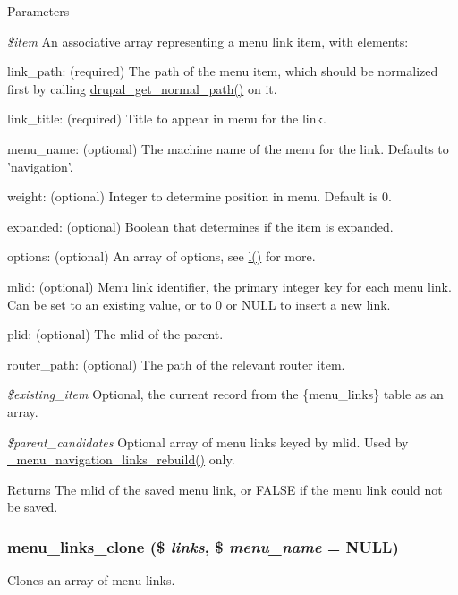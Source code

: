 \begin{DoxyParams}{Parameters}
\item[{\em \$item}]An associative array representing a menu link item, with elements:
\begin{DoxyItemize}
\item link\_\-path: (required) The path of the menu item, which should be normalized first by calling \hyperlink{path_8inc_a59781811cbcdef4c64ccd1d55e1ae9f8}{drupal\_\-get\_\-normal\_\-path()} on it.
\item link\_\-title: (required) Title to appear in menu for the link.
\item menu\_\-name: (optional) The machine name of the menu for the link. Defaults to 'navigation'.
\item weight: (optional) Integer to determine position in menu. Default is 0.
\item expanded: (optional) Boolean that determines if the item is expanded.
\item options: (optional) An array of options, see \hyperlink{common_8inc_ad3b36c06dc46250b8d22b8d0d2e7bd97}{l()} for more.
\item mlid: (optional) Menu link identifier, the primary integer key for each menu link. Can be set to an existing value, or to 0 or NULL to insert a new link.
\item plid: (optional) The mlid of the parent.
\item router\_\-path: (optional) The path of the relevant router item. 
\end{DoxyItemize}\item[{\em \$existing\_\-item}]Optional, the current record from the \{menu\_\-links\} table as an array. \item[{\em \$parent\_\-candidates}]Optional array of menu links keyed by mlid. Used by \hyperlink{group__menu_ga69fdf86c20d033bc7ba46a14937e20ea}{\_\-menu\_\-navigation\_\-links\_\-rebuild()} only.\end{DoxyParams}
\begin{DoxyReturn}{Returns}
The mlid of the saved menu link, or FALSE if the menu link could not be saved. 
\end{DoxyReturn}
\hypertarget{group__menu_ga327aef442c1c6c4b2a7d14742f37af2a}{
\subsubsection[{menu\_\-links\_\-clone}]{\setlength{\rightskip}{0pt plus 5cm}menu\_\-links\_\-clone (\$ {\em links}, \/  \$ {\em menu\_\-name} = {\ttfamily NULL})}}
\label{group__menu_ga327aef442c1c6c4b2a7d14742f37af2a}
Clones an array of menu links.


